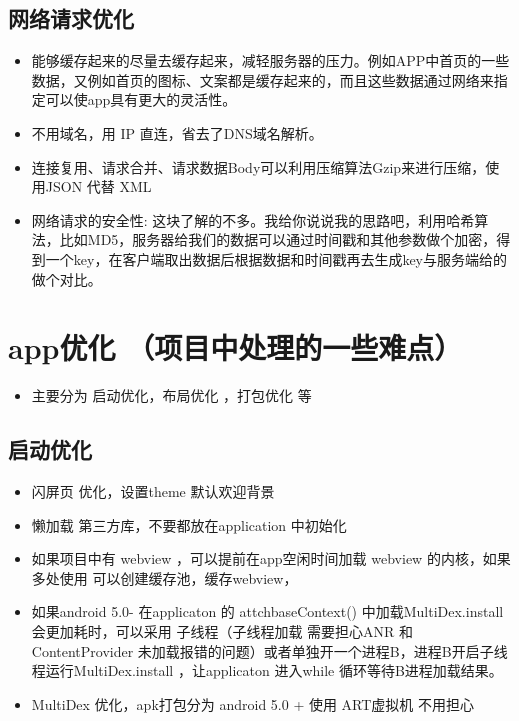 \documentclass[9pt, b5paper]{article}
\begin{document}
\subsection{网络请求优化}
\label{sec-1-6}
\begin{itemize}
\item 能够缓存起来的尽量去缓存起来，减轻服务器的压力。例如APP中首页的一些数据，又例如首页的图标、文案都是缓存起来的，而且这些数据通过网络来指定可以使app具有更大的灵活性。
\item 不用域名，用 IP 直连，省去了DNS域名解析。
\item 连接复用、请求合并、请求数据Body可以利用压缩算法Gzip来进行压缩，使用JSON 代替 XML
\item 网络请求的安全性: 这块了解的不多。我给你说说我的思路吧，利用哈希算法，比如MD5，服务器给我们的数据可以通过时间戳和其他参数做个加密，得到一个key，在客户端取出数据后根据数据和时间戳再去生成key与服务端给的做个对比。
\end{itemize}

\section{app优化 （项目中处理的一些难点）}
\label{sec-2}
\begin{itemize}
\item 主要分为 启动优化，布局优化 ，打包优化 等
\end{itemize}
\subsection{启动优化}
\label{sec-2-1}
\begin{itemize}
\item 闪屏页 优化，设置theme 默认欢迎背景
\item 懒加载 第三方库，不要都放在application 中初始化
\item 如果项目中有 webview ，可以提前在app空闲时间加载 webview 的内核，如果多处使用 可以创建缓存池，缓存webview，
\item 如果android 5.0- 在applicaton 的 attchbaseContext() 中加载MultiDex.install 会更加耗时，可以采用 子线程（子线程加载 需要担心ANR 和ContentProvider 未加载报错的问题）或者单独开一个进程B，进程B开启子线程运行MultiDex.install ，让applicaton 进入while 循环等待B进程加载结果。
\item MultiDex 优化，apk打包分为 android 5.0 + 使用 ART虚拟机 不用担心
\end{itemize}
\end{document}
